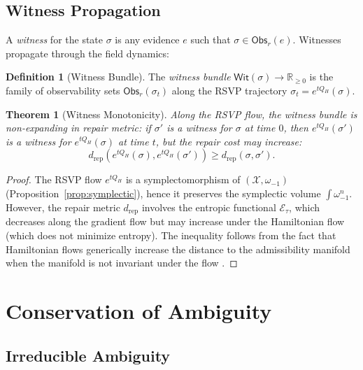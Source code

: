 \documentclass[a4paper,12pt]{article}
\newtheorem{theorem}{Theorem}[section]
\theoremstyle{definition}
\newtheorem{definition}{Definition}[section]
\newcommand{\Etau}{\mathcal{E}_\tau}
\newcommand{\X}{\mathcal{X}}
\newcommand{\dRP}{d_{\mathrm{rep}}}
\newcommand{\Obs}{\mathsf{Obs}}
\newcommand{\Wit}{\mathsf{Wit}}
\newcommand{\R}{\mathbb{R}}
\begin{document}
\subsection{Witness Propagation}

A \emph{witness} for the state $\sigma$ is any evidence $e$ such that $\sigma \in \Obs_r(e)$. Witnesses propagate through the field dynamics:

\begin{definition}[Witness Bundle]
\label{def:witness}
The \emph{witness bundle} $\Wit(\sigma) \to \R_{\geq 0}$ is the family of observability sets $\Obs_r(\sigma_t)$ along the RSVP trajectory $\sigma_t = e^{tQ_H}(\sigma)$.
\end{definition}

\begin{theorem}[Witness Monotonicity]
\label{thm:witness_mono}
Along the RSVP flow, the witness bundle is non-expanding in repair metric: if $\sigma'$ is a witness for $\sigma$ at time $0$, then $e^{tQ_H}(\sigma')$ is a witness for $e^{tQ_H}(\sigma)$ at time $t$, but the repair cost may increase:
\[
\dRP(e^{tQ_H}(\sigma), e^{tQ_H}(\sigma')) \geq \dRP(\sigma, \sigma').
\]
\end{theorem}

\begin{proof}
The RSVP flow $e^{tQ_H}$ is a symplectomorphism of $(\X, \omega_{-1})$ (Proposition~\ref{prop:symplectic}), hence it preserves the symplectic volume $\int \omega_{-1}^n$. However, the repair metric $\dRP$ involves the entropic functional $\Etau$, which decreases along the gradient flow but may increase under the Hamiltonian flow (which does not minimize entropy). The inequality follows from the fact that Hamiltonian flows generically increase the distance to the admissibility manifold when the manifold is not invariant under the flow \cite{Arnold1989}.
\end{proof}

\section{Conservation of Ambiguity}
\label{sec:conservation}

\subsection{Irreducible Ambiguity}
\end{document}
